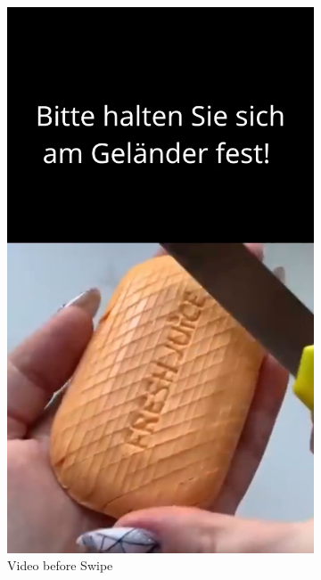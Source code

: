 \documentclass{article}
\begin{document}
\begin{figure}[H]
    \centering
    \begin{subfigure}[t]{0.45\textwidth}
        \centering
        \includegraphics[width=\textwidth]{./resources/StairTikTokBrain_1.png}
        \caption{Video before Swipe}
    \end{subfigure}
    \hfill
    \begin{subfigure}[t]{0.45\textwidth}
        \centering

\end{subfigure}
\end{figure}
\end{document}
